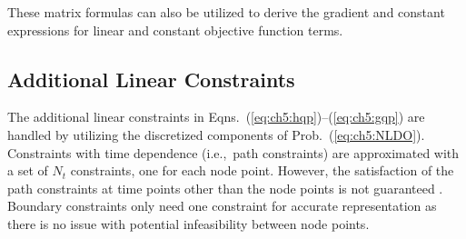 \noindent These matrix formulas can also be utilized to derive the gradient and constant expressions for linear and constant objective function terms.

\subsection{Additional Linear Constraints}

The additional linear constraints in Eqns.~(\ref{eq:ch5:hqp})--(\ref{eq:ch5:gqp}) are handled by utilizing the discretized components of Prob.~(\ref{eq:ch5:NLDO}).
Constraints with time dependence (i.e.,~path constraints) are approximated with a set of $N_t$ constraints, one for each node point. 
However, the satisfaction of the path constraints at time points other than the node points is not guaranteed \cite{Biegler2010a}.
Boundary constraints only need one constraint for accurate representation as there is no issue with potential infeasibility between node points.